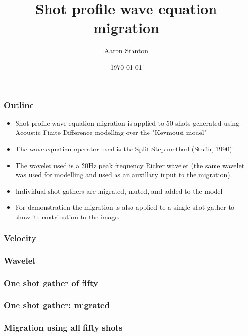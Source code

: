 \title[Short title]{Shot profile wave equation migration}
\author{Aaron Stanton}
\date{\today}


\maketitle
{}
\begin{frame} \frametitle{Outline}
    \begin{itemize}
        \item Shot profile wave equation migration is applied to 50 shots generated using Acoustic Finite Difference modelling over the "Kevmousi model"
        \item The wave equation operator used is the Split-Step method (Stoffa, 1990)
        \item The wavelet used is a 20Hz peak frequency Ricker wavelet (the same wavelet was used for modelling and used as an auxillary input to the migration).
        \item Individual shot gathers are migrated, muted, and added to the model
        \item For demonstration the migration is also applied to a single shot gather to show its contribution to the image.
    \end{itemize}
\end{frame}

\begin{frame} \frametitle{Velocity}
\end{frame}

\begin{frame} \frametitle{Wavelet}
\end{frame}

\begin{frame} \frametitle{One shot gather of fifty}
\end{frame}

\begin{frame} \frametitle{One shot gather: migrated}
\end{frame}

\begin{frame} \frametitle{Migration using all fifty shots}
\end{frame}


